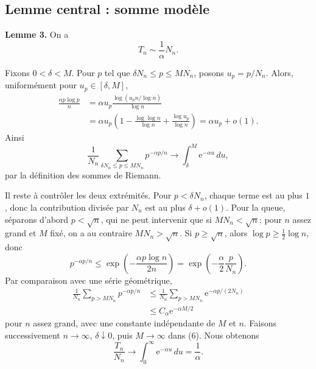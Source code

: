 \documentclass[11pt,a4paper]{article}
\newcommand{\e}{\mathrm e}
\begin{document}
\subsection{Lemme central : somme mod\`ele}
\begin{lemmabox}
\textbf{Lemme 3.} On a
\[
 T_n\sim\frac1\alpha N_n.
\]
\end{lemmabox}
\begin{proofbox}
Fixons $0<\delta<M$. Pour $p$ tel que $\delta N_n\leq p\leq MN_n$, posons
$u_p=p/N_n$. Alors, uniform\'ement pour $u_p\in[\delta,M]$,
\begin{align*}
\frac{\alpha p\log p}{n}
&=\alpha u_p\frac{\log(u_p n/\log n)}{\log n}\\
&=\alpha u_p\left(1-\frac{\log\log n}{\log n}
  +\frac{\log u_p}{\log n}\right)
=\alpha u_p+o(1).
\end{align*}
Ainsi
\[
 \frac1{N_n}\sum_{\delta N_n\leq p\leq MN_n}p^{-\alpha p/n}
 \longrightarrow\int_\delta^M\e^{-\alpha u}\,du, \tag{6}
\]
par la d\'efinition des sommes de Riemann.

Il reste \`a contr\^oler les deux extr\'emit\'es. Pour $p<\delta N_n$, chaque
terme est au plus $1$, donc la contribution divis\'ee par $N_n$ est au plus
$\delta+o(1)$. Pour la queue, s\'eparons d'abord $p<\sqrt n$, qui ne peut
intervenir que si $M N_n<\sqrt n$; pour $n$ assez grand et $M$ fix\'e, on a au
contraire $MN_n>\sqrt n$. Si $p\geq\sqrt n$, alors
$\log p\geq\frac12\log n$, donc
\[
 p^{-\alpha p/n}\leq
 \exp\left(-\frac{\alpha p\log n}{2n}\right)
 =\exp\left(-\frac{\alpha}{2}\frac{p}{N_n}\right).
\]
Par comparaison avec une s\'erie g\'eom\'etrique,
\begin{align*}
\frac1{N_n}\sum_{p>MN_n}p^{-\alpha p/n}
&\leq\frac1{N_n}\sum_{p>MN_n}\e^{-\alpha p/(2N_n)}\\
&\leq C_\alpha\e^{-\alpha M/2}
\end{align*}
pour $n$ assez grand, avec une constante ind\'ependante de $M$ et $n$.
Faisons successivement $n\to\infty$, $\delta\downarrow0$, puis $M\to\infty$
dans (6). Nous obtenons
\[
 \frac{T_n}{N_n}\longrightarrow\int_0^\infty\e^{-\alpha u}\,du=\frac1\alpha.
\]
\end{proofbox}
\end{document}
